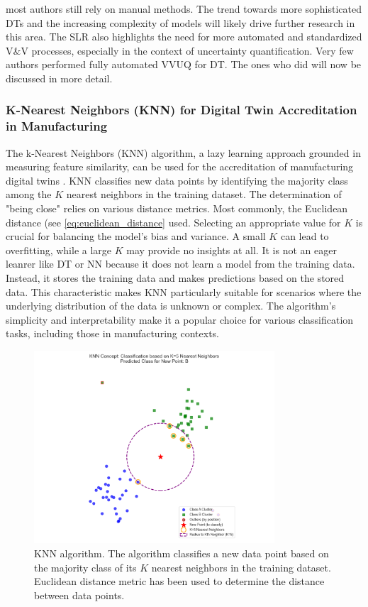 most authors still rely on manual methods. The trend towards more sophisticated DTs and the increasing complexity of models will likely drive further research in this area. The SLR also highlights the need for more automated and standardized V&V processes, especially in the context of uncertainty quantification. Very few authors performed fully automated VVUQ for DT. The ones who did will now be discussed in more detail.


\subsubsection*{K-Nearest Neighbors (KNN) for Digital Twin Accreditation in Manufacturing}
\label{sec:knn}
The k-Nearest Neighbors (KNN) algorithm, a lazy learning approach grounded in measuring feature similarity, can be used for the accreditation of manufacturing digital twins \autocite{dos2024simulation}. KNN classifies new data points by identifying the majority class among the $K$ nearest neighbors in the training dataset. The determination of "being close" relies on various distance metrics. Most commonly, the Euclidean distance (see \autoref{eq:euclidean_distance} used. Selecting an appropriate value for $K$ is crucial for balancing the model's bias and variance. A small $K$ can lead to overfitting, while a large $K$ may provide no insights at all. It is not an eager leanrer like DT or NN because it does not learn a model from the training data. Instead, it stores the training data and makes predictions based on the stored data. This characteristic makes KNN particularly suitable for scenarios where the underlying distribution of the data is unknown or complex. The algorithm's simplicity and interpretability make it a popular choice for various classification tasks, including those in manufacturing contexts.

\begin{figure}[htbp]
  \centering
  \includegraphics[width=0.8\textwidth]{figures/knn.png}
  \caption{KNN algorithm. The algorithm classifies a new data point based on the majority class of its $K$ nearest neighbors in the training dataset. Euclidean distance metric has been used to determine the distance between data points.}
  \label{fig:vvbitencourt}
\end{figure}

